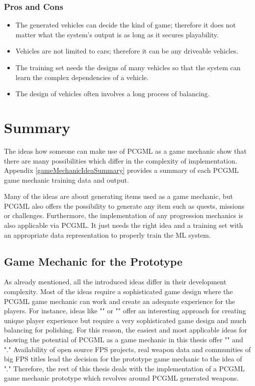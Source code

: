 \documentclass[MGS,Master,english]{twbook}%
\begin{document}
\subsubsection{Pros and Cons}
\begin{itemize}
	\item The generated vehicles can decide the kind of game; therefore it does not matter what the system's output is as long as it secures playability.
	\item Vehicles are not limited to cars; therefore it can be any driveable vehicles.
	\item The training set needs the designs of many vehicles so that the system can learn the complex dependencies of a vehicle.
	\item The design of vehicles often involves a long process of balancing.
\end{itemize}

\section{Summary}
The ideas how someone can make use of PCGML as a game mechanic show that there are many possibilities which differ in the complexity of implementation. Appendix \ref{gameMechanicIdeaSummary} provides a summary of each PCGML game mechanic training data and output.

Many of the ideas are about generating items used as a game mechanic, but PCGML also offers the possibility to generate any item such as quests, missions or challenges. Furthermore, the implementation of any progression mechanics is also applicable via PCGML. It just needs the right idea and a training set with an appropriate data representation to properly train the ML system.

\subsection{Game Mechanic for the Prototype}
As already mentioned, all the introduced ideas differ in their development complexity. Most of the ideas require a sophisticated game design where the PCGML game mechanic can work and create an adequate experience for the players. For instance, ideas like "" or "" offer an interesting approach for creating unique player experience but require a very sophisticated game design and much balancing for polishing. For this reason, the easiest and most applicable ideas for showing the potential of PCGML as a game mechanic in this thesis offer "" and "." Availability of open source FPS projects, real weapon data and communities of big FPS titles lead the decision for the prototype game mechanic to the idea of "." Therefore, the rest of this thesis deals with the implementation of a PCGML game mechanic prototype which revolves around PCGML generated weapons.
\end{document}
